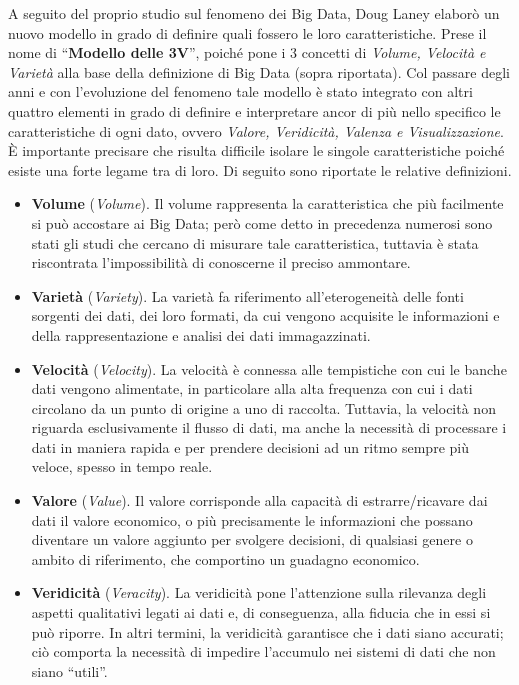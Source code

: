 A seguito del proprio studio sul fenomeno dei Big Data, Doug Laney elaborò un nuovo modello in grado di definire quali fossero le loro caratteristiche. Prese il nome di “\textbf{Modello delle 3V}”, poiché pone i 3 concetti di \textit{Volume, Velocità e Varietà} alla base della definizione di Big Data (sopra riportata). Col passare degli anni e con l'evoluzione del fenomeno tale modello è stato integrato con altri quattro elementi in grado di definire e interpretare ancor di più nello specifico le caratteristiche di ogni dato, ovvero \textit{Valore, Veridicità, Valenza e Visualizzazione}. È importante precisare che risulta difficile isolare le singole caratteristiche poiché esiste una forte legame tra di loro. Di seguito sono riportate le relative definizioni.\cite{agcom_big_data}
\begin{itemize}
    \item \textbf{Volume} (\textit{Volume}). Il volume rappresenta la caratteristica che più facilmente si può accostare ai Big Data; però come detto in precedenza numerosi sono stati gli studi che cercano di misurare tale caratteristica, tuttavia è stata riscontrata l'impossibilità di conoscerne il preciso ammontare.
    \item \textbf{Varietà} (\textit{Variety}). La varietà fa riferimento all'eterogeneità delle fonti sorgenti dei dati, dei loro formati, da cui vengono acquisite le informazioni e della rappresentazione e analisi dei dati immagazzinati.
    \item \textbf{Velocità} (\textit{Velocity}). La velocità è connessa alle tempistiche con cui le banche dati vengono alimentate, in particolare alla alta frequenza con cui i dati circolano da un punto di origine a uno di raccolta. Tuttavia, la velocità non riguarda esclusivamente il flusso di dati, ma anche la necessità di processare i dati in maniera rapida e per prendere decisioni ad un ritmo sempre più veloce, spesso in tempo reale.
    \item \textbf{Valore} (\textit{Value}). Il valore corrisponde alla capacità di estrarre/ricavare dai dati il valore economico, o più precisamente le informazioni che possano diventare un valore aggiunto per svolgere decisioni, di qualsiasi genere o ambito di riferimento, che comportino un guadagno economico. 
    \item \textbf{Veridicità} (\textit{Veracity}). La veridicità pone l'attenzione sulla rilevanza degli aspetti qualitativi legati ai dati e, di conseguenza, alla fiducia che in essi si può riporre. In altri termini, la veridicità garantisce che i dati siano accurati; ciò comporta la necessità di impedire l'accumulo nei sistemi di dati che non siano “utili”.

\end{itemize}

